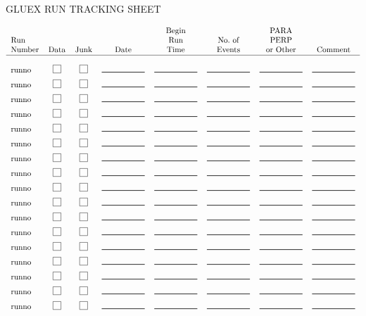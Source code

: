 \documentclass[12pt]{article}
\newcommand{\cbox}{\raisebox{.6ex}{\fbox{\rule{0in}{0.05in}\rule{0.05in}{0in}}}}
\newcommand{\eline}{\rule{0.75in}{0.01in}}
\begin{document}
\begin{center}
GLUEX RUN TRACKING SHEET
\end{center}

$$
\begin{tabular}{lcccccccc}
       &      &      &      & Begin &         & PARA \\
Run    &      &      &      & Run   & No.\ of & PERP  \\
Number & Data & Junk & Date & Time  & Events  & or Other & Comment\\
\hline
\\
runno & \cbox & \cbox & \eline & \eline & \eline & \eline & \eline \\[0.075in]
runno & \cbox & \cbox & \eline & \eline & \eline & \eline & \eline \\[0.075in]
runno & \cbox & \cbox & \eline & \eline & \eline & \eline & \eline \\[0.075in]
runno & \cbox & \cbox & \eline & \eline & \eline & \eline & \eline \\[0.075in]
runno & \cbox & \cbox & \eline & \eline & \eline & \eline & \eline \\[0.075in]
runno & \cbox & \cbox & \eline & \eline & \eline & \eline & \eline \\[0.075in]
runno & \cbox & \cbox & \eline & \eline & \eline & \eline & \eline \\[0.075in]
runno & \cbox & \cbox & \eline & \eline & \eline & \eline & \eline \\[0.075in]
runno & \cbox & \cbox & \eline & \eline & \eline & \eline & \eline \\[0.075in]
runno & \cbox & \cbox & \eline & \eline & \eline & \eline & \eline \\[0.075in]
runno & \cbox & \cbox & \eline & \eline & \eline & \eline & \eline \\[0.075in]
runno & \cbox & \cbox & \eline & \eline & \eline & \eline & \eline \\[0.075in]
runno & \cbox & \cbox & \eline & \eline & \eline & \eline & \eline \\[0.075in]
runno & \cbox & \cbox & \eline & \eline & \eline & \eline & \eline \\[0.075in]
runno & \cbox & \cbox & \eline & \eline & \eline & \eline & \eline \\[0.075in]
runno & \cbox & \cbox & \eline & \eline & \eline & \eline & \eline \\[0.075in]
runno & \cbox & \cbox & \eline & \eline & \eline & \eline & \eline \\[0.075in]

\end{tabular}$$
\end{document}
